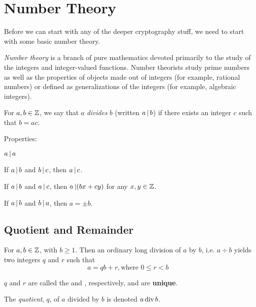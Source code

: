 \section{Number Theory}\label{sec:Number_Theory}
Before we can start with any of the deeper cryptography stuff, we need to start with some basic number theory.
\begin{definition}\label{def:Number_Theory}
  \emph{Number theory} is a branch of pure mathematics devoted primarily to the study of the integers and integer-valued functions.
  Number theorists study prime numbers as well as the properties of objects made out of integers (for example, rational numbers) or defined as generalizations of the integers (for example, algebraic integers).
\end{definition}

\begin{definition}[Divides]\label{def:Divides}
  For $a, b \in \operatorname{\mathbb{Z}}$, we say that $a$ \emph{divides} $b$ (written $a \operatorname{\vert} b$) if there exists an integer $c$ such that $b = ac$.

  Properties:
  \begin{propertylist}
  \item $a \operatorname{\vert} a$
  \item If $a \operatorname{\vert} b$ and $b \operatorname{\vert} c$, then $a \operatorname{\vert} c$.
  \item If $a \operatorname{\vert} b$ and $a \operatorname{\vert} c$, then $a \operatorname{\vert} (bx + cy)$ for any $x, y \in \operatorname{\mathbb{Z}}$.
  \item If $a \operatorname{\vert} b$ and $b \operatorname{\vert} a$, then $a = \pm b$.
  \end{propertylist}
\end{definition}

\subsection{Quotient and Remainder}\label{subsec:Quotient_and_Remainder}
For $a, b \in \operatorname{\mathbb{Z}}$, with $b \geq 1$.
Then an ordinary long division of $a$ by $b$, i.e. $a \div b$ yields two integers $q$ and $r$ such that
\begin{equation}\label{eq:Quotient_and_Remainder}
  a = qb + r, \text{where } 0 \leq r < b
\end{equation}

$q$ and $r$ are called the  and , respectively, and are \textbf{unique}.

\begin{definition}[Quotient]\label{def:Quotient}
  The \emph{quotient}, $q$, of $a$ divided by $b$ is denoted $a \operatorname{\text{div}} b$.
\end{definition}

